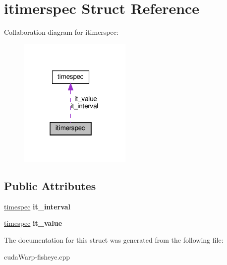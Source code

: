 \hypertarget{structitimerspec}{}\section{itimerspec Struct Reference}
\label{structitimerspec}


Collaboration diagram for itimerspec\+:\nopagebreak
\begin{figure}[H]
\begin{center}
\leavevmode
\includegraphics[width=154pt]{structitimerspec__coll__graph}
\end{center}
\end{figure}
\subsection*{Public Attributes}
\begin{DoxyCompactItemize}
\item 
\hyperlink{structtimespec}{timespec} {\bfseries it\+\_\+interval}\hypertarget{structitimerspec_ad27ebf9ac3e6d87529483e2340fb4cc0}{}\label{structitimerspec_ad27ebf9ac3e6d87529483e2340fb4cc0}

\item 
\hyperlink{structtimespec}{timespec} {\bfseries it\+\_\+value}\hypertarget{structitimerspec_a6869573d650475ac5c30114ee1a68b1b}{}\label{structitimerspec_a6869573d650475ac5c30114ee1a68b1b}

\end{DoxyCompactItemize}


The documentation for this struct was generated from the following file\+:\begin{DoxyCompactItemize}
\item 
cuda\+Warp-\/fisheye.\+cpp\end{DoxyCompactItemize}
